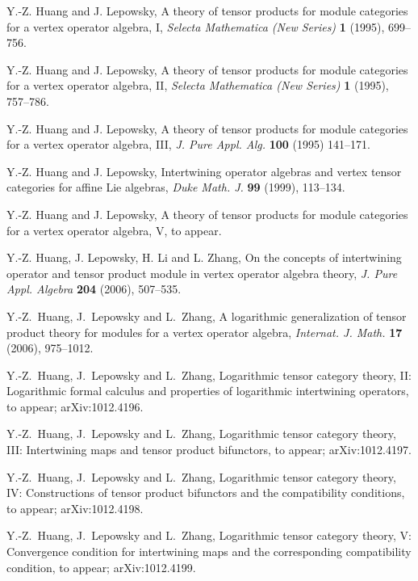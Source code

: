 \documentclass[12pt]{article}
\begin{document}
\begin{thebibliography}{FGST2}
Y.-Z. Huang and J. Lepowsky, A theory of tensor products for module
categories for a vertex operator algebra, I, {\em Selecta Mathematica
(New Series)} {\bf 1} (1995), 699--756.

Y.-Z. Huang and J. Lepowsky, A theory of tensor products for module
categories for a vertex operator algebra, II, {\em Selecta Mathematica
(New Series)} {\bf 1} (1995), 757--786.

Y.-Z. Huang and J. Lepowsky, A theory of tensor
products for module categories for a vertex operator algebra, III,
{\em J. Pure Appl. Alg.} {\bf 100} (1995) 141--171.

Y.-Z. Huang and J. Lepowsky,
Intertwining operator algebras and vertex tensor categories for
affine Lie algebras, {\em Duke Math. J.} {\bf 99} (1999), 113--134.

Y.-Z. Huang and J. Lepowsky, A theory of tensor products for module
categories for a vertex operator algebra, V, to appear.

Y.-Z. Huang, J. Lepowsky, H. Li and L. Zhang, On the concepts of
intertwining operator and tensor product module in vertex operator
algebra theory, {\em J. Pure Appl. Algebra} {\bf 204} (2006),
507--535.

 Y.-Z.~Huang, J.~Lepowsky and L.~Zhang, A
logarithmic generalization of tensor product theory for modules for a
vertex operator algebra, {\em Internat. J. Math.} {\bf 17} (2006),
975--1012.

 Y.-Z.~Huang, J.~Lepowsky and L.~Zhang, Logarithmic
tensor category theory, II: Logarithmic formal calculus
and properties of logarithmic intertwining operators, to appear; arXiv:1012.4196.

 Y.-Z.~Huang, J.~Lepowsky and L.~Zhang, Logarithmic
tensor category theory, III: Intertwining maps and tensor
product bifunctors, to appear; arXiv:1012.4197.

 Y.-Z.~Huang, J.~Lepowsky and L.~Zhang, Logarithmic
tensor category theory, IV: Constructions of tensor
product bifunctors and the compatibility conditions, to appear; arXiv:1012.4198.

 Y.-Z.~Huang, J.~Lepowsky and L.~Zhang, Logarithmic
tensor category theory, V: Convergence condition for
intertwining maps and the corresponding compatibility
condition, to appear; arXiv:1012.4199.


\end{thebibliography}
\end{document}
